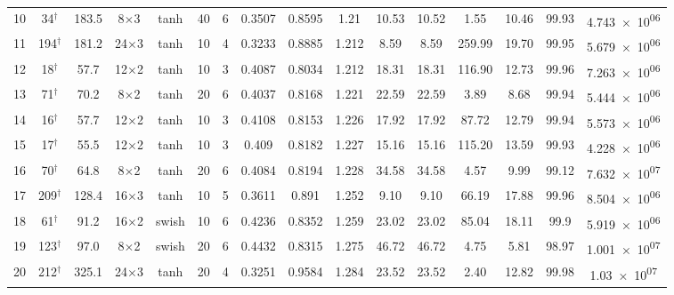 \begin{tabular}{lcc cccc ccccccc cc}
  10 & 34$^\dagger$ & 183.5 & 8$\times$3 & tanh & 40 & 6 & \num{0.3507} & \num{0.8595} & \num{1.21} & 10.53 & 10.52 & 1.55 & 10.46 & \num{99.93} & \num{4.743e+06} \\
  11 & 194$^\dagger$ & 181.2 & 24$\times$3 & tanh & 10 & 4 & \num{0.3233} & \num{0.8885} & \num{1.212} & 8.59 & 8.59 & 259.99 & 19.70 & \num{99.95} & \num{5.679e+06} \\
  12 & 18$^\dagger$ & 57.7 & 12$\times$2 & tanh & 10 & 3 & \num{0.4087} & \num{0.8034} & \num{1.212} & 18.31 & 18.31 & 116.90 & 12.73 & \num{99.96} & \num{7.263e+06} \\
  13 & 71$^\dagger$ & 70.2 & 8$\times$2 & tanh & 20 & 6 & \num{0.4037} & \num{0.8168} & \num{1.221} & 22.59 & 22.59 & 3.89 & 8.68 & \num{99.94} & \num{5.444e+06} \\
  14 & 16$^\dagger$ & 57.7 & 12$\times$2 & tanh & 10 & 3 & \num{0.4108} & \num{0.8153} & \num{1.226} & 17.92 & 17.92 & 87.72 & 12.79 & \num{99.94} & \num{5.573e+06} \\
  15 & 17$^\dagger$ & 55.5 & 12$\times$2 & tanh & 10 & 3 & \num{0.409} & \num{0.8182} & \num{1.227} & 15.16 & 15.16 & 115.20 & 13.59 & \num{99.93} & \num{4.228e+06} \\
  16 & 70$^\dagger$ & 64.8 & 8$\times$2 & tanh & 20 & 6 & \num{0.4084} & \num{0.8194} & \num{1.228} & 34.58 & 34.58 & 4.57 & 9.99 & \num{99.12} & \num{7.632e+07} \\
  17 & 209$^\dagger$ & 128.4 & 16$\times$3 & tanh & 10 & 5 & \num{0.3611} & \num{0.891} & \num{1.252} & 9.10 & 9.10 & 66.19 & 17.88 & \num{99.96} & \num{8.504e+06} \\
  18 & 61$^\dagger$ & 91.2 & 16$\times$2 & swish & 10 & 6 & \num{0.4236} & \num{0.8352} & \num{1.259} & 23.02 & 23.02 & 85.04 & 18.11 & \num{99.9} & \num{5.919e+06} \\
  19 & 123$^\dagger$ & 97.0 & 8$\times$2 & swish & 20 & 6 & \num{0.4432} & \num{0.8315} & \num{1.275} & 46.72 & 46.72 & 4.75 & 5.81 & \num{98.97} & \num{1.001e+07} \\
  20 & 212$^\dagger$ & 325.1 & 24$\times$3 & tanh & 20 & 4 & \num{0.3251} & \num{0.9584} & \num{1.284} & 23.52 & 23.52 & 2.40 & 12.82 & \num{99.98} & \num{1.03e+07} \\
\bottomrule
\end{tabular}
